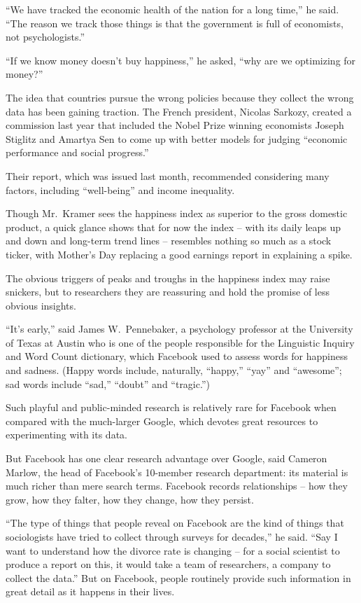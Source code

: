 ﻿\documentclass[12pt]{article}
\begin{document}
``We have tracked the economic health of the nation for a long time,'' he said. ``The reason we
track those things is that the government is full of economists, not psychologists.''

``If we know money doesn't buy happiness,'' he asked, ``why are we optimizing for money?''

The idea that countries pursue the wrong policies because they collect the wrong data has been
gaining traction. The French president, Nicolas Sarkozy, created a commission last year that
included the Nobel Prize winning economists Joseph Stiglitz and Amartya Sen to come up with better
models for judging ``economic performance and social progress.''

Their report, which was issued last month, recommended considering many factors, including
``well-being'' and income inequality.

Though Mr.~Kramer sees the happiness index as superior to the gross domestic product, a quick glance
shows that for now the index -- with its daily leaps up and down and long-term trend lines --
resembles nothing so much as a stock ticker, with Mother's Day replacing a good earnings report in
explaining a spike.

The obvious triggers of peaks and troughs in the happiness index may raise snickers, but to
researchers they are reassuring and hold the promise of less obvious insights.

``It's early,'' said James W.~Pennebaker, a psychology professor at the University of Texas at
Austin who is one of the people responsible for the Linguistic Inquiry and Word Count dictionary,
which Facebook used to assess words for happiness and sadness. (Happy words include, naturally,
``happy,'' ``yay'' and ``awesome''; sad words include ``sad,'' ``doubt'' and ``tragic.'')

Such playful and public-minded research is relatively rare for Facebook when compared with the
much-larger Google, which devotes great resources to experimenting with its data.

But Facebook has one clear research advantage over Google, said Cameron Marlow, the head of
Facebook's 10-member research department: its material is much richer than mere search terms.
Facebook records relationships -- how they grow, how they falter, how they change, how they persist.

``The type of things that people reveal on Facebook are the kind of things that sociologists have
tried to collect through surveys for decades,'' he said. ``Say I want to understand how the divorce
rate is changing -- for a social scientist to produce a report on this, it would take a team of
researchers, a company to collect the data.'' But on Facebook, people routinely provide such
information in great detail as it happens in their lives.
\end{document}
